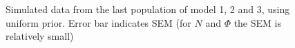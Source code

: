 \begin{figure}[H]

    \begin{center}
    \end{center}

    \caption[Simulated data from the last population of model 1, 2 and 3, using uniform prior]{Simulated data from the last population of model 1, 2 and 3, using uniform prior.  Error bar indicates SEM (for $N$ and $\Phi$ the SEM is relatively small)}
    \label{fig:resultCurve_uni}


\end{figure}

